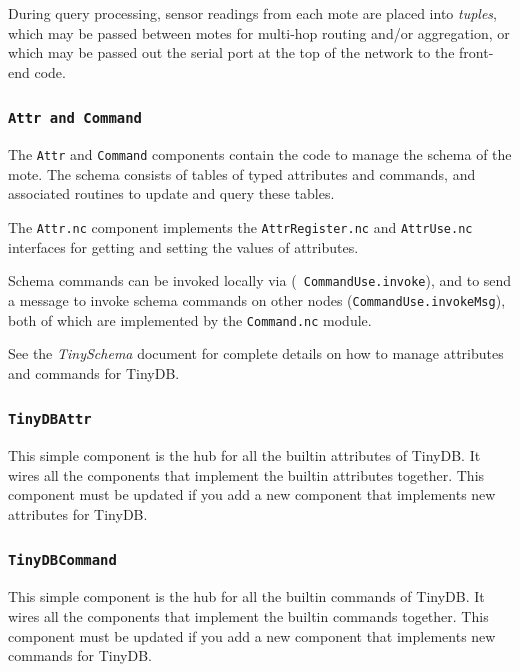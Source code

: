 \documentclass[11pt]{article}
\begin{document}
During query processing, sensor readings from each mote are placed
into {\em tuples}, which may be passed between motes for multi-hop
routing and/or aggregation, or which may be passed out the serial port
at the top of the network to the front-end code.

\subsubsection{\tt Attr and Command}
\label{sec:schema}
The {\tt Attr} and {\tt Command} components contain the code 
to manage the schema  of the mote. The schema consists
of tables of
typed attributes and commands, and associated routines to
update and query these tables.

The {\tt Attr.nc} component implements the {\tt AttrRegister.nc} and {\tt AttrUse.nc} interfaces
for getting and setting the values of attributes.  

Schema commands can be invoked locally via ({\tt
CommandUse.invoke}), and to send a message to invoke schema
commands on other nodes ({\tt CommandUse.invokeMsg}), both of
which are implemented by the {\tt Command.nc} module.

See the {\em TinySchema} document for complete details on how to manage
attributes and commands for TinyDB.

\subsubsection {\tt TinyDBAttr}
\label{sec:attr}
This simple component is the hub for all the
builtin attributes of TinyDB.  It wires all the components that
implement the builtin attributes together.  This component
must be updated if you add a new component that implements
new attributes for TinyDB.

\subsubsection {\tt TinyDBCommand}
\label{sec:command}
This simple component is the hub for all the
builtin commands of TinyDB.  It wires all the components that
implement the builtin commands together.  This component
must be updated if you add a new component that implements
new commands for TinyDB.
\end{document}
